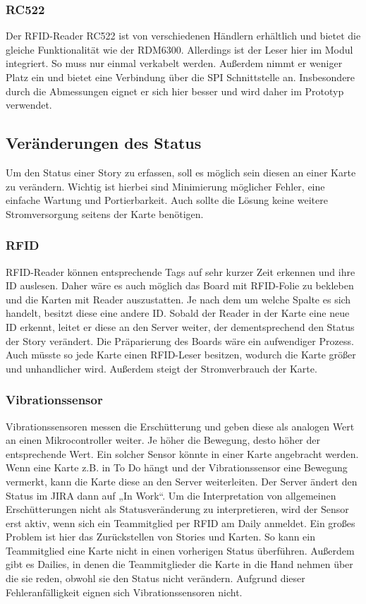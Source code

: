 \documentclass[12pt,titlepage]{scrartcl}
\begin{document}
			\subsubsection{RC522}
			Der RFID-Reader RC522 ist von verschiedenen Händlern erhältlich und bietet die gleiche Funktionalität wie der RDM6300. Allerdings ist der Leser hier im Modul integriert. So muss nur einmal verkabelt werden. Außerdem nimmt er weniger Platz ein und bietet eine Verbindung über die SPI Schnittstelle an. Insbesondere durch die Abmessungen eignet er sich hier besser und wird daher im Prototyp verwendet.
		\subsection{Veränderungen des Status} \label{changeStatus}
		Um den Status einer Story zu erfassen, soll es möglich sein diesen an einer Karte zu verändern. Wichtig ist hierbei sind Minimierung möglicher Fehler, eine einfache Wartung und Portierbarkeit. Auch sollte die Lösung keine weitere Stromversorgung seitens der Karte benötigen.
			\subsubsection{RFID}
			RFID-Reader können entsprechende Tags auf sehr kurzer Zeit erkennen und ihre ID auslesen. Daher wäre es auch möglich das Board mit RFID-Folie zu bekleben und die Karten mit Reader auszustatten. Je nach dem um welche Spalte es sich handelt, besitzt diese eine andere ID. Sobald der Reader in der Karte eine neue ID erkennt, leitet er diese an den Server weiter, der dementsprechend den Status der Story verändert. Die Präparierung des Boards wäre ein aufwendiger Prozess. Auch müsste so jede Karte einen RFID-Leser besitzen, wodurch die Karte größer und unhandlicher wird. Außerdem steigt der Stromverbrauch der Karte.
			\subsubsection{Vibrationssensor}
			Vibrationssensoren messen die Erschütterung und geben diese als analogen Wert an einen Mikrocontroller weiter. Je höher die Bewegung, desto höher der entsprechende Wert. Ein solcher Sensor könnte in einer Karte angebracht werden. Wenn eine Karte z.B. in To Do hängt und der Vibrationssensor eine Bewegung vermerkt, kann die Karte diese an den Server weiterleiten. Der Server ändert den Status im JIRA dann auf „In Work“. Um die Interpretation von allgemeinen Erschütterungen nicht als Statusveränderung zu interpretieren, wird der Sensor erst aktiv, wenn sich ein Teammitglied per RFID am Daily anmeldet. Ein großes Problem ist hier das Zurückstellen von Stories und Karten. So kann ein Teammitglied eine Karte nicht in einen vorherigen Status überführen. Außerdem gibt es Dailies, in denen die Teammitglieder die Karte in die Hand nehmen über die sie reden, obwohl sie den Status nicht verändern. Aufgrund dieser Fehleranfälligkeit eignen sich Vibrationssensoren nicht.
\end{document}
